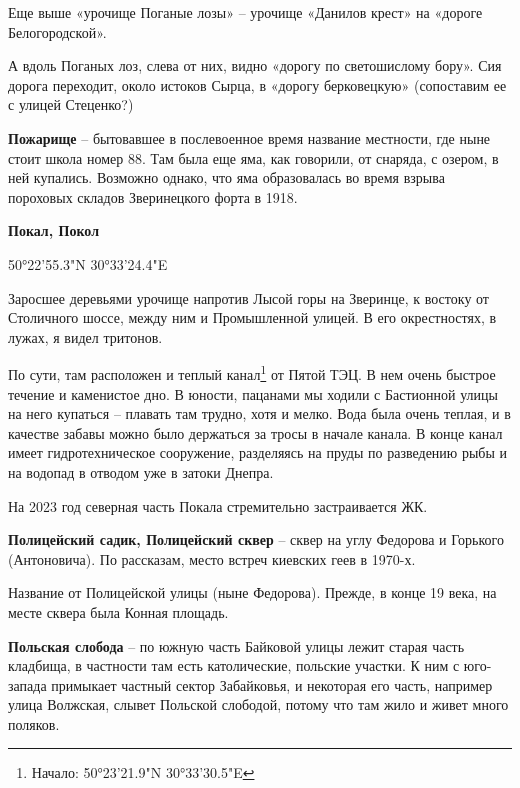     Еще выше «урочище Поганые лозы» – урочище «Данилов крест» на «дороге Белогородской». 

А вдоль Поганых лоз, слева от них, видно «дорогу по светошислому бору». Сия дорога переходит, около истоков Сырца, в «дорогу берковецкую» (сопоставим ее с улицей Стеценко?)

\medskip

\textbf{Пожарище} – бытовавшее в послевоенное время название местности, где ныне стоит школа номер 88. Там была еще яма, как говорили, от снаряда, с озером, в ней купались. Возможно однако, что яма образовалась во время взрыва пороховых складов Зверинецкого форта в 1918.\\

\medskip

\textbf{Покал, Покол} 

50°22'55.3"N 30°33'24.4"E

Заросшее деревьями урочище напротив Лысой горы на Зверинце, к востоку от Столичного шоссе, между ним и Промышленной улицей. В его окрестностях, в лужах, я видел тритонов.

По сути, там расположен и теплый канал\footnote{Начало: 50°23'21.9"N 30°33'30.5"E} от Пятой ТЭЦ. В нем очень быстрое течение и каменистое дно. В юности, пацанами мы ходили с Бастионной улицы на него купаться – плавать там трудно, хотя и мелко. Вода была очень теплая, и в качестве забавы можно было держаться за тросы в начале канала. В конце канал имеет гидротехническое сооружение, разделяясь на пруды по разведению рыбы и на водопад в отводом уже в затоки Днепра.

На 2023 год северная часть Покала стремительно застраивается ЖК.\\

\medskip

\textbf{Полицейский садик, Полицейский сквер} – сквер на углу Федорова и Горького (Антоновича). По рассказам, место встреч киевских геев в 1970-х.

Название от Полицейской улицы (ныне Федорова). Прежде, в конце 19 века, на месте сквера была Конная площадь.\\

\medskip


\textbf{Польская слобода} – по южную часть Байковой улицы лежит старая часть кладбища, в частности там есть католические, польские участки. К ним с юго-запада примыкает частный сектор Забайковья, и некоторая его часть, например улица Волжская, слывет Польской слободой, потому что там жило и живет много поляков.\\

